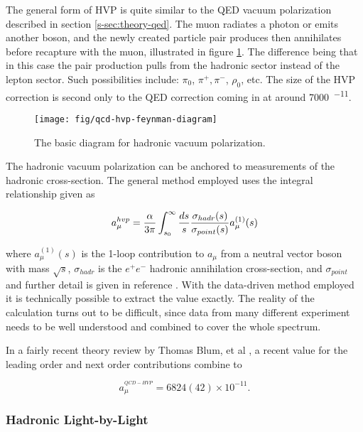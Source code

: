 The general form of HVP is quite similar to the QED vacuum polarization described in section \ref{s-sec:theory-qed}.  The muon radiates a photon or emits another boson, and the newly created particle pair produces then annihilates before recapture with the muon, illustrated in figure \ref{fig:qcd-hvp-feynman-diagram}.  The difference being that in this case the pair production pulls from the hadronic sector instead of the lepton sector.  Such possibilities include: $\pi_0$, $\pi^+, \pi^-$, $\rho_0$, etc.  The size of the HVP correction is second only to the QED correction coming in at around \SI{7000}{^{-11}}.

\begin{figure}
\centering
\texttt{[image: fig/qcd-hvp-feynman-diagram]}
\caption{The basic diagram for hadronic vacuum polarization. \label{fig:qcd-hvp-feynman-diagram}}
\end{figure}

The hadronic vacuum polarization can be anchored to measurements of the hadronic cross-section.  The general method employed uses the integral relationship given as

\begin{equation}
\label{eqn:qcd-hvp-integral}
a_\mu^{hvp} = \frac{\alpha}{3\pi} \int_{s_0}^{\infty} \frac{ds}{s} \\
\frac{\sigma_{hadr}(s)}{\sigma_{point}(s)} a_\mu^{(1)}(s)
\end{equation}

\noindent
where $a_\mu^{(1)}(s)$ is the 1-loop contribution to $a_\mu$ from a neutral vector boson with mass $\sqrt{s}$, $\sigma_{hadr}$ is the $e^+e^-$ hadronic annihilation cross-section, and $\sigma_{point}$ and further detail is given in reference \cite{amm-of-muon}.  With the data-driven method employed it is technically possible to extract the value exactly.  The reality of the calculation turns out to be difficult, since data from many different experiment needs to be well understood and combined to cover the whole spectrum.  

In a fairly recent theory review by Thomas Blum, et al \cite{muon-g-2-blum}, a recent value for the leading order and next order contributions combine to 

\begin{equation}
\label{eqn:qcd-hvp-total}
a_\mu^{^{QCD-HVP}} = 6824(42) \times 10^{-11}.
\end{equation}

\subsubsection{Hadronic Light-by-Light}


